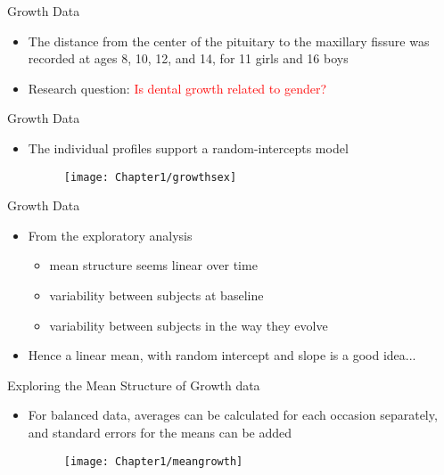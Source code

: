 \documentclass{beamer}
\begin{document}
\begin{frame}{Growth Data}

\begin{itemize}
	\item The distance from the center of the pituitary to the maxillary fissure was recorded
	at ages 8, 10, 12, and 14, for 11 girls and 16 boys
	\item Research question: {\textcolor{red} {Is dental growth related to gender?}}
\end{itemize}
\end{frame}

\begin{frame}{Growth Data}
\begin{itemize}
	\item The individual profiles support a random-intercepts model
	\begin{figure}[h!]
		\centering
		\texttt{[image: Chapter1/growthsex]}
	\end{figure}	
\end{itemize}
\end{frame}

\begin{frame}{Growth Data}
\begin{itemize}
	\item From the exploratory analysis
	\vspace*{2mm}
	\begin{itemize}
		\item mean structure seems linear over time \vspace*{2mm}
		\item variability between subjects at baseline \vspace*{2mm}
		\item variability between subjects in the way they evolve \vspace*{2mm}
	\end{itemize}
	\item Hence a linear mean, with random intercept and slope is a good idea...
\end{itemize}
\end{frame}

\begin{frame}{Exploring the Mean Structure of Growth data}
\begin{itemize}
	\item For balanced data, averages can be calculated for each occasion separately, and standard errors for the means can be added
	\begin{figure}[h!]
		\centering
		\texttt{[image: Chapter1/meangrowth]}
	\end{figure}
\end{itemize}
\end{frame}
\end{document}
